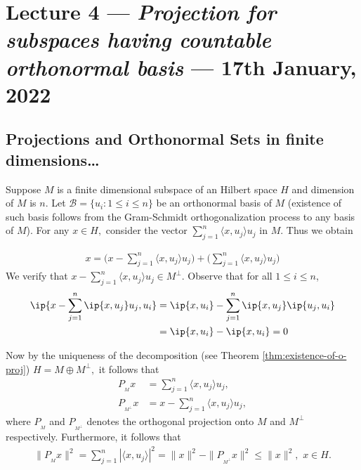 \section{Lecture 4 --- \textit{Projection for subspaces having countable orthonormal basis} --- 17th January, 2022} 
\subsection{Projections and Orthonormal Sets in finite dimensions\ldots}
Suppose $M$ is a finite dimensional subspace of an Hilbert space $H$ and dimension of $M$ is $n.$ Let $\mathcal B = \{u_{i} : 1 \leqslant i\leqslant n\}$ be an orthonormal basis of $M$ (existence of such basis follows from the Gram-Schmidt orthogonalization process to any basis of $M$). For any $x\in H,$ consider the vector $\sum\limits_{j=1}^n \langle x, u_j\rangle u_j$ in $M.$  Thus we obtain

\begin{align*}
x=\Big( x-\sum\limits_{j=1}^n \langle x, u_j\rangle u_j \Big)  + \Big( \sum\limits_{j=1}^n \langle x, u_j\rangle u_j \Big)
\end{align*}
We verify that $x-\sum_{j=1}^n \langle x, u_j\rangle u_j \in M^{\perp}$. Observe that for all $1\le i \le n$,
\begin{align*}
    \ip{x - \sum_{j=1}^{n} \ip{x,u_{j}}u_{j}, u_{i}} &= \ip{x, u_{i}} - \sum_{j=1}^{n} \ip{x,u_{j}}\ip{u_{j}, u_{i}}\\
    &=\ip{x,{u_{i}}} - \ip{x,{u_{i}}} = 0
\end{align*}


Now by the uniqueness of the decomposition (see Theorem \ref{thm:existence-of-o-proj}) $H= M \oplus M^{\perp},$ it follows that 
\begin{align*}
P_{_M}x &= \sum_{j=1}^n \langle x, u_j\rangle u_j,\\
P_{_{M^{\perp}}}x &= x-  \sum_{j=1}^n \langle x, u_j\rangle u_j,
\end{align*}
where $P_{_M}$ and $P_{_{M^{\perp}}}$ denotes the orthogonal projection onto $M$ and $M^{\perp}$ respectively. Furthermore, it follows that 
\begin{align}
\|P_{_M}x\|^2 = \sum_{j=1}^n |\langle x, u_j\rangle|^2 = \|x\|^2- \|P_{_{M^{\perp}}}x\|^2 \leqslant \|x\|^2,\,\,x\in H.
\label{eqn:Bessel-in-finite}
\end{align}

